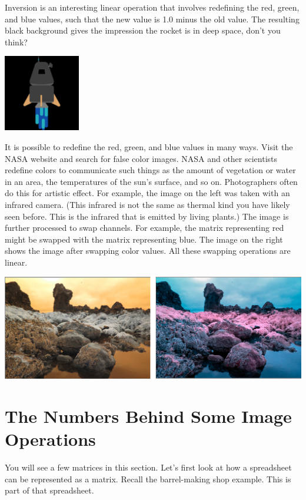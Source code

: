 Inversion is an interesting linear operation that involves redefining the red, 
green, and blue values, such that the new value is 1.0 minus the old value. 
The resulting black background gives the impression the rocket is in deep 
space, don't you think?

\includegraphics[width=0.25\textwidth]{rocket-inverted.png}

It is possible to redefine the red, green, and blue values in many ways. Visit 
the NASA website and search for false color images. NASA and other scientists 
redefine colors to communicate such things as the amount of vegetation or 
water in an area, the temperatures of the sun's surface, and so on. 
Photographers often do this for artistic effect. For example, the image on the 
left was taken with an infrared camera. (This infrared is not the same as 
thermal kind you have likely seen before. This is the infrared that is emitted 
by living plants.) The image is further processed to swap channels. For 
example, the matrix representing red might be swapped with the matrix 
representing blue. The image on the right shows the image after swapping color 
values. All these swapping operations are linear.

\includegraphics[width=1.0\textwidth]{infrared.png}

\section{The Numbers Behind Some Image Operations}

You will see a few matrices in this section. Let's first look at how a 
spreadsheet can be represented as a matrix. Recall the barrel-making shop 
example. This is part of that spreadsheet. 

